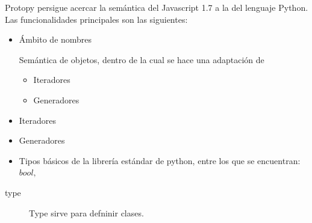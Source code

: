 \documentclass[a4paper]{report}
\begin{document}
\label{ch:protopy}

Protopy persigue acercar la semántica del Javascript 1.7 a la del lenguaje
Python. Las funcionalidades principales son las siguientes:
\begin{itemize}
  \item Ámbito de nombres
  \begin{item}
  Semántica de objetos, dentro de la cual se hace una adaptación de
  \begin{itemize}
  	\item Iteradores
  	\item Generadores  
  \end{itemize}
  \end{item}
  
  
  \item Iteradores
  \item Generadores
  
  \item Tipos básicos de la librería estándar de python, entre los que se
  encuentran: $ bool, $
\end{itemize}


\begin{description}
\item[type]{
Type sirve para defninir clases.
}
\end{description}
\begin{thebibliography}{99}


\end{thebibliography}

\printglossary
\end{document}
